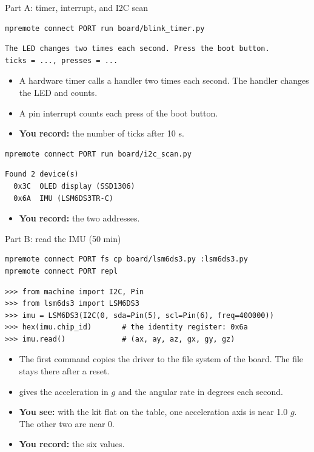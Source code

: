 \begin{frame}[fragile]{Part A: timer, interrupt, and I2C scan}
\begin{lstlisting}[style=shell]
mpremote connect PORT run board/blink_timer.py
\end{lstlisting}
\begin{lstlisting}
The LED changes two times each second. Press the boot button.
ticks = ..., presses = ...
\end{lstlisting}
  \small
  \begin{itemize}
    \item A hardware timer calls a handler two times each second. The
          handler changes the LED and counts.
    \item A pin interrupt counts each press of the boot button.
    \item \textbf{You record:} the number of ticks after 10 s.
  \end{itemize}
\begin{lstlisting}[style=shell]
mpremote connect PORT run board/i2c_scan.py
\end{lstlisting}
\begin{lstlisting}
Found 2 device(s)
  0x3C  OLED display (SSD1306)
  0x6A  IMU (LSM6DS3TR-C)
\end{lstlisting}
  \begin{itemize}
    \item \textbf{You record:} the two addresses.
  \end{itemize}
\end{frame}

\begin{frame}[fragile]{Part B: read the IMU (50 min)}
\begin{lstlisting}[style=shell]
mpremote connect PORT fs cp board/lsm6ds3.py :lsm6ds3.py
mpremote connect PORT repl
\end{lstlisting}
\begin{lstlisting}[style=python]
>>> from machine import I2C, Pin
>>> from lsm6ds3 import LSM6DS3
>>> imu = LSM6DS3(I2C(0, sda=Pin(5), scl=Pin(6), freq=400000))
>>> hex(imu.chip_id)       # the identity register: 0x6a
>>> imu.read()             # (ax, ay, az, gx, gy, gz)
\end{lstlisting}
  \small
  \begin{itemize}
    \item The first command copies the driver to the file system of the
          board. The file stays there after a reset.
    \item {} gives the acceleration in $g$ and the angular
          rate in degrees each second.
    \item \textbf{You see:} with the kit flat on the table, one acceleration
          axis is near 1.0 $g$. The other two are near 0.
    \item \textbf{You record:} the six values.
  \end{itemize}
\end{frame}

